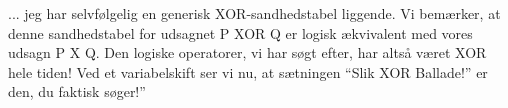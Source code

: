 \documentclass[a4paper,11pt]{article}
\begin{document}
\begin{sketch}
... jeg har selvfølgelig en generisk XOR-sandhedstabel liggende. Vi bemærker, at denne sandhedstabel for udsagnet P XOR Q er logisk ækvivalent med vores udsagn P X Q. Den logiske operatorer, vi har søgt efter, har altså været XOR hele tiden! Ved et variabelskift ser vi nu, at sætningen “Slik XOR Ballade!” er den, du faktisk søger!”
\end{sketch}
\end{document}
